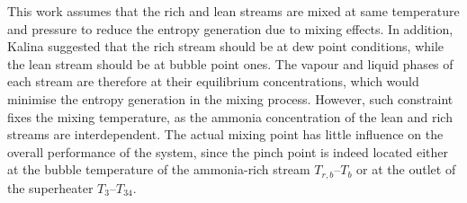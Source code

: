 \documentclass[final,times,3p]{elsarticle}
\begin{document}
 

This work assumes that the rich and lean streams are mixed at same temperature and pressure to reduce the entropy generation due to mixing effects. In addition, Kalina \cite{Kalina1986a} suggested that the rich stream should be at dew point conditions, while the lean stream should be at bubble point ones. The vapour and liquid phases of each stream are therefore at their equilibrium concentrations, which would minimise the entropy generation in the mixing process. However, such constraint fixes the mixing temperature, as the ammonia concentration of the lean and rich streams are interdependent. The actual mixing point has little influence on the overall performance of the system, since the pinch point is indeed located either at the bubble temperature of the ammonia-rich stream $T_{r,b}$--$T_{b}$ or at the outlet of the superheater $T_{3}$--$T_{34}$. 
\end{document}
